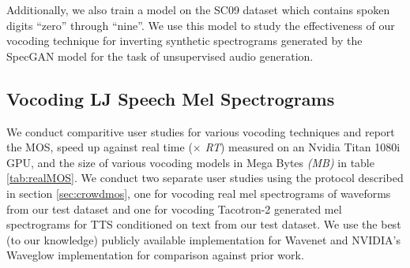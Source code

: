 \documentclass[a4paper]{article}
\begin{document}
Additionally, we also train a model on the SC09 dataset \cite{donahue2019wavegan} which contains spoken digits ``zero'' through ``nine''. We use this model to study the effectiveness of our vocoding technique for inverting synthetic spectrograms generated by the SpecGAN model \cite{donahue2019wavegan} for the task of unsupervised audio generation.



\subsection{Vocoding LJ Speech Mel Spectrograms}

We conduct comparitive user studies for various vocoding techniques and report the MOS, speed up against real time (\textit{$\times$ RT}) measured on an Nvidia Titan 1080i GPU, and the size of various vocoding models in Mega Bytes \textit{(MB)} in table \ref{tab:realMOS}. 
We conduct two separate user studies using the protocol described in section \ref{sec:crowdmos}, one for vocoding real mel spectrograms of waveforms from our test dataset and one for vocoding Tacotron-2  generated mel spectrograms for TTS conditioned on text from our test dataset. We use the best (to our knowledge) publicly available implementation for Wavenet \cite{r9y9} and NVIDIA's Waveglow implementation \cite{waveglowgithub} for comparison against prior work. 
\end{document}
